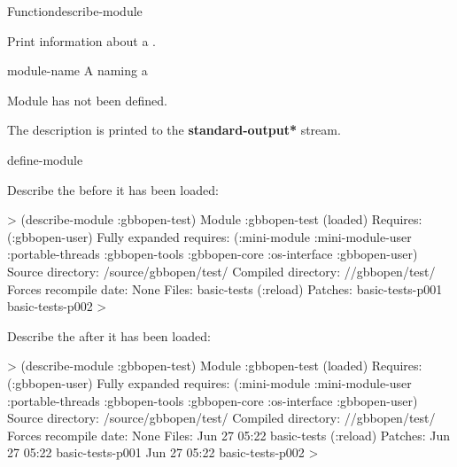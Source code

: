 \documentclass[10pt,twoside,english,pdftex]{article}
\begin{document}
\begin{functiondoc}{Function}{describe-module}{}
%
%
%

\fnsyntax 

\fnpurpose Print information about a .

\fnpackage {}

\fnmodule {}

\fnargs
\begin{args}{module-name}
 A  naming a 
\end{args}

\fnerrors
Module  has not been defined.\\
\relativedircircularity

\fndescription
{}%
The description is printed to the {\bf *standard-output*} stream.

\begin{alsos}{define-module}
\end{alsos}

\fnexamples
Describe the   before it has been loaded:
%
\W\supp
\begin{example}
  > (describe-module :gbbopen-test)
  Module :gbbopen-test (loaded)
    Requires: (:gbbopen-user)
    Fully expanded requires: (:mini-module :mini-module-user :portable-threads
                              :gbbopen-tools :gbbopen-core :os-interface :gbbopen-user)
    Source directory: /source/gbbopen/test/
    Compiled directory: //gbbopen/test/
    Forces recompile date: None
    Files:              basic-tests (:reload)
    Patches:            basic-tests-p001 
                        basic-tests-p002 
  >
\end{example}

Describe the   after it has been loaded:
%
\W\supp
\begin{example}
  > (describe-module :gbbopen-test)
  Module :gbbopen-test (loaded)
    Requires: (:gbbopen-user)
    Fully expanded requires: (:mini-module :mini-module-user :portable-threads
                              :gbbopen-tools :gbbopen-core :os-interface :gbbopen-user)
    Source directory: /source/gbbopen/test/
    Compiled directory: //gbbopen/test/
    Forces recompile date: None
    Files:   Jun 27 05:22 basic-tests (:reload)
    Patches: Jun 27 05:22 basic-tests-p001 
             Jun 27 05:22 basic-tests-p002 
  >
\end{example}

\end{functiondoc}
\end{document}
